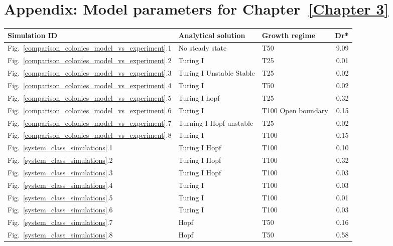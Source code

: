 \chapter{Appendix: Model parameters for Chapter~\ref{Chapter 3}}
\begin{table}
    \centering
    \begin{adjustbox}{center}
        \begin{tabular}{lllr}
            \toprule
            \textbf{Simulation ID} & \textbf{Analytical solution} & \textbf{Growth regime} & \textbf{Dr*} \\
            \midrule
             Fig.~\ref{comparison_colonies_model_vs_experiment}.1 & No steady state & T50 & 9.09 \\
             Fig.~\ref{comparison_colonies_model_vs_experiment}.2 & Turing I & T25 & 0.01 \\
             Fig.~\ref{comparison_colonies_model_vs_experiment}.3 & Turing I Unstable Stable & T25 & 0.02 \\
             Fig.~\ref{comparison_colonies_model_vs_experiment}.4 & Turing I & T50 & 0.02 \\
             Fig.~\ref{comparison_colonies_model_vs_experiment}.5 & Turing I hopf & T25 & 0.32 \\
             Fig.~\ref{comparison_colonies_model_vs_experiment}.6 & Turing I & T100 Open boundary & 0.15 \\
             Fig.~\ref{comparison_colonies_model_vs_experiment}.7 & Turning I Hopf unstable & T25 & 0.02 \\
             Fig.~\ref{comparison_colonies_model_vs_experiment}.8 & Turing I & T100 & 0.15 \\
             Fig.~\ref{system_class_simulations}.1 & Turing I Hopf & T100 & 0.10 \\
             Fig.~\ref{system_class_simulations}.2 & Turing I Hopf & T100 & 0.32 \\
             Fig.~\ref{system_class_simulations}.3 & Turing I Hopf & T100 & 0.03 \\
             Fig.~\ref{system_class_simulations}.4 & Turing I & T100 & 0.03 \\
             Fig.~\ref{system_class_simulations}.5 & Turing I & T100 & 0.01 \\
             Fig.~\ref{system_class_simulations}.6 & Turing I & T100 & 0.03 \\
             Fig.~\ref{system_class_simulations}.7 & Hopf & T50 & 0.16 \\
             Fig.~\ref{system_class_simulations}.8 & Hopf & T50 & 0.58 \\

\end{tabular}
\end{adjustbox}
\end{table}

